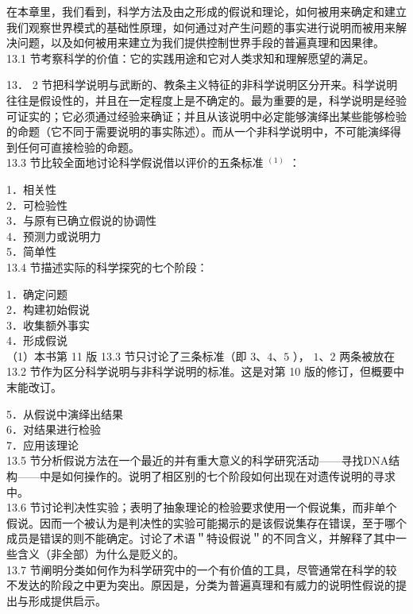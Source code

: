 在本章里，我们看到，科学方法及由之形成的假说和理论，如何被用来确定和建立我们观察世界模式的基础性原理，如何通过对产生问题的事实进行说明而被用来解决问题，以及如何被用来建立为我们提供控制世界手段的普遍真理和因果律。\\
13.1 节考察科学的价值：它的实践用途和它对人类求知和理解愿望的满足。

13． 2 节把科学说明与武断的、教条主义特征的非科学说明区分开来。科学说明往往是假设性的，并且在一定程度上是不确定的。最为重要的是，科学说明是经验可证实的；它必须通过经验来确证；并且从该说明中必定能够演绎出某些能够检验的命题（它不同于需要说明的事实陈述）。而从一个非科学说明中，不可能演绎得到任何可直接检验的命题。\\
13.3 节比较全面地讨论科学假说借以评价的五条标准 ${ }^{(1)}$ ：

1．相关性\\
2．可检验性\\
3．与原有已确立假说的协调性\\
4．预测力或说明力\\
5．简单性\\
13.4 节描述实际的科学探究的七个阶段：

1．确定问题\\
2．构建初始假说\\
3．收集额外事实\\
4．形成假说\\
（1）本书第 11 版 13.3 节只讨论了三条标准（即 $3 、 4 、 5$ ）， $1 、 2$ 两条被放在 13.2 节作为区分科学说明与非科学说明的标准。这是对第 10 版的修订，但概要中末能改订。

5．从假说中演绎出结果\\
6．对结果进行检验\\
7．应用该理论\\
13.5 节分析假说方法在一个最近的并有重大意义的科学研究活动——寻找DNA结构——中是如何操作的。说明了相区别的七个阶段如何出现在对遗传说明的寻求中。\\
13.6 节讨论判决性实验；表明了抽象理论的检验要求使用一个假说集，而非单个假说。因而一个被认为是判决性的实验可能揭示的是该假说集存在错误，至于哪个成员是错误的则不能确定。讨论了术语＂特设假说＂的不同含义，并解释了其中一些含义（非全部）为什么是贬义的。\\
13.7 节阐明分类如何作为科学研究中的一个有价值的工具，尽管通常在科学的较不发达的阶段之中更为突出。原因是，分类为普遍真理和有威力的说明性假说的提出与形成提供启示。

